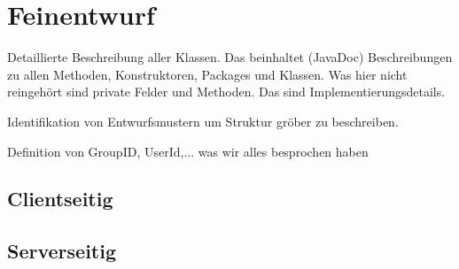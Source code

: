 \section{Feinentwurf}
Detaillierte Beschreibung aller Klassen. Das beinhaltet (JavaDoc) Beschreibungen zu allen Methoden, Konstruktoren, Packages und Klassen. Was hier nicht reingehört sind private Felder und Methoden. Das sind Implementierungsdetails.

Identifikation von Entwurfsmustern um Struktur gröber zu beschreiben.

Definition von GroupID, UserId,... was wir alles besprochen haben

\subsection{Clientseitig}




\subsection{Serverseitig}


